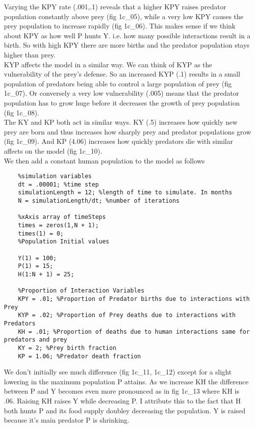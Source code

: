 \documentclass{article}
\begin{document}
  Varying the KPY rate (.001,.1) reveals that a higher KPY raises predator population
  constantly above prey (fig 1c\_05), while a very low KPY causes the prey population
  to increase rapidly (fig 1c\_06). This makes sense if we think about KPY as how well
  P hunts Y. i.e. how many possible interactions result in a birth. So with high
  KPY there are more births and the predator population stays higher than prey.\\

  KYP affects the model in a similar way. We can think of KYP as the vulnerability
  of the prey’s defense. So an increased KYP (.1) results in a small population of
  predators being able to control a large population of prey (fig 1c\_07). Or conversely
  a very low vulnerability (.005) means that the predator population has to grow
  huge before it decreases the growth of prey population (fig 1c\_08).\\

  The KY and KP both act in similar ways. KY (.5) increases how quickly new prey
  are born and thus increases how sharply prey and predator populations grow (fig 1c\_09).
  And KP (4.06) increases how quickly predators die with similar affects on the model
  (fig 1c\_10).\\

  We then add a constant human population to the model as follows\\

  \begin{verbatim}
    %simulation variables
    dt = .00001; %time step
    simulationLength = 12; %length of time to simulate. In months
    N = simulationLength/dt; %number of iterations

    %xAxis array of timeSteps
    times = zeros(1,N + 1);
    times(1) = 0;
    %Population Initial values

    Y(1) = 100;
    P(1) = 15;
    H(1:N + 1) = 25;

    %Proportion of Interaction Variables
    KPY = .01; %Proportion of Predator births due to interactions with Prey
    KYP = .02; %Proportion of Prey deaths due to interactions with Predators
    KH = .01; %Proportion of deaths due to human interactions same for predators and prey
    KY = 2; %Prey birth fraction
    KP = 1.06; %Predator death fraction
  \end{verbatim}

  We don't initially see much difference (fig 1c\_11, 1c\_12) except for a slight lowering
  in the maximum population P attains. As we increase KH the difference between P and Y
  becomes even more pronounced as in fig 1c\_13 where KH is .06. Raising KH raises Y while
  decreasing P. I attribute this to the fact that H both hunts P and its food supply
  doubley decreasing the population. Y is raised because it's main predator P is shrinking.\\
\end{document}
